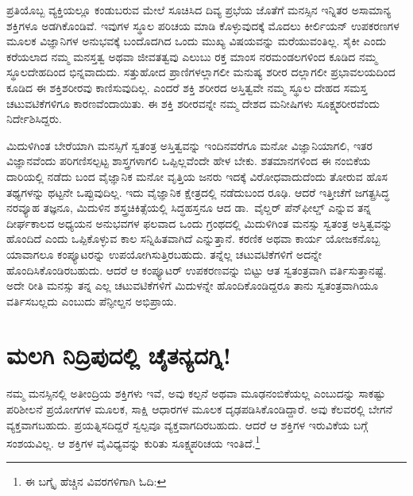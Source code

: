 ಪ್ರತಿಯೊಬ್ಬ ವ್ಯಕ್ತಿಯಲ್ಲೂ ಕಂಡುಬರುವ ಮೇಲೆ ಸೂಚಿಸಿದ ದಿವ್ಯ ಪ್ರಭೆಯ ಜೊತೆಗೆ ಮನಸ್ಸಿನ ಇನ್ನಿತರ ಅಸಾಮಾನ್ಯ ಶಕ್ತಿಗಳೂ ಅಡಗಿಕೊಂಡಿವೆ. ಇವುಗಳ ಸ್ಥೂಲ ಪರಿಚಯ ಮಾಡಿ ಕೊಳ್ಳುವುದಕ್ಕೆ ಮೊದಲು ಕೀರ್ಲಿಯನ್ ಉಪಕರಣಗಳ ಮೂಲಕ ವಿಜ್ಞಾನಿಗಳ ಅನುಭವಕ್ಕೆ ಬಂದೊದಗಿದ ಒಂದು ಮುಖ್ಯ ವಿಷಯವನ್ನು ಮರೆಯುವಂತಿಲ್ಲ. ಸೈಕೀ ಎಂದು ಕರೆಯಲಾದ ನಮ್ಮ ಮನಸ್ತತ್ವ ಅಥವಾ ಜೀವತತ್ವವು ಎಲುಬು ರಕ್ತ ಮಾಂಸ ನರಮಂಡಲಗಳಿಂದ ಕೂಡಿದ ನಮ್ಮ ಸ್ಥೂಲದೇಹದಿಂದ ಭಿನ್ನವಾದುದು. ಸತ್ತುಹೋದ ಪ್ರಾಣಿಗಳಲ್ಲಾಗಲೀ ಮನುಷ್ಯ ಶರೀರ ದಲ್ಲಾಗಲೀ ಪ್ರಭಾವಲಯದಿಂದ ಕೂಡಿದ ಈ ಶಕ್ತಿಶರೀರವು ಕಾಣಿಸುವುದಿಲ್ಲ. ಎಂದರೆ ಶಕ್ತಿ ಶರೀರದ ಅಸ್ತಿತ್ವವೇ ನಮ್ಮ ಸ್ಥೂಲ ದೇಹದ ಸಮಸ್ತ ಚಟುವಟಿಕೆಗಳಿಗೂ ಕಾರಣವೆಂದಾಯಿತು. ಈ ಶಕ್ತಿ ಶರೀರವನ್ನೇ ನಮ್ಮ ದೇಶದ ಮನೀಷಿಗಳು ಸೂಕ್ಷ್ಮಶರೀರವೆಂದು ನಿರ್ದೇಶಿಸಿದ್ದರು.

\vskip 3pt

ಮಿದುಳಿಗಿಂತ ಬೇರೆಯಾಗಿ ಮನಸ್ಸಿಗೆ ಸ್ವತಂತ್ರ ಅಸ್ತಿತ್ವವನ್ನು ಇಂದಿನವರೆಗೂ ಮನೋ ವಿಜ್ಞಾನಿಯಾಗಲಿ, ಇತರ ವಿಜ್ಞಾನವೆಂದು ಪರಿಗಣಿಸಲ್ಪಟ್ಟ ಶಾಸ್ತ್ರಗಳಾಗಲಿ ಒಪ್ಪಿಲ್ಲವೆಂದೇ ಹೇಳ ಬೇಕು. ಶತಮಾನಗಳಿಂದ ಈ ನಂಬಿಕೆಯ ದಾರಿಯಲ್ಲಿ ನಡೆದು ಬಂದ ವೈಜ್ಞಾನಿಕ ಮನೋ ವೃತ್ತಿಯ ಜನರು ಇದಕ್ಕೆ ವಿರೋಧವಾದುದೆಂದು ತೋರುವ ಹೊಸ ತಥ್ಯಗಳನ್ನು ಥಟ್ಟನೇ ಒಪ್ಪುವುದಿಲ್ಲ. ಇದು ವೈಜ್ಞಾನಿಕ ಕ್ಷೇತ್ರದಲ್ಲಿ ನಡೆದುಬಂದ ರೂಢಿ. ಆದರೆ ಇತ್ತೀಚೆಗೆ ಜಗತ್ಪ್ರಸಿದ್ಧ ನರವ್ಯೂಹ ತಜ್ಞನೂ, ಮಿದುಳಿನ ಶಸ್ತ್ರಚಿಕಿತ್ಸೆಯಲ್ಲಿ ಸಿದ್ಧಹಸ್ತನೂ ಆದ ಡಾ.\ ವೈಲ್ಡರ್ ಪೆನ್​ಫೀಲ್ಡ್  ಎನ್ನುವ ತನ್ನ ದೀರ್ಘಕಾಲದ ಅಧ್ಯಯನ ಅನುಭವಗಳ ಫಲವಾದ ಒಂದು ಗ್ರಂಥದಲ್ಲಿ ಮಿದುಳಿಗಿಂತ ಮನಸ್ಸು ಸ್ವತಂತ್ರ ಅಸ್ತಿತ್ವವನ್ನು ಹೊಂದಿದೆ ಎಂದು ಒಪ್ಪಿಕೊಳ್ಳುವ ಕಾಲ ಸನ್ನಿಹಿತವಾಗಿದೆ ಎನ್ನುತ್ತಾನೆ. ಕರಣಿಕ ಅಥವಾ ಕಾರ್ಯ ಯೋಜಕನೊಬ್ಬ ಯಾವಾಗಲೂ ಕಂಪ್ಯೂಟರನ್ನು ಉಪಯೋಗಿಸುತ್ತಿರಬಹುದು. ತನ್ನೆಲ್ಲ ಚಟುವಟಿಕೆಗಳಿಗೆ ಅದನ್ನೇ ಹೊಂದಿಸಿಕೊಂಡಿರಬಹುದು. ಆದರೆ ಆ ಕಂಪ್ಯೂಟರ್ ಉಪಕರಣವನ್ನು ಬಿಟ್ಟು ಆತ ಸ್ವತಂತ್ರವಾಗಿ ವರ್ತಿಸುತ್ತಾನಷ್ಟೆ. ಅದೇ ರೀತಿ ಮನಸ್ಸು ತನ್ನ ಎಲ್ಲ ಚಟುವಟಿಕೆಗಳಿಗೆ ಮಿದುಳನ್ನೇ ಹೊಂದಿಕೊಂಡಿದ್ದರೂ ತಾನು ಸ್ವತಂತ್ರವಾಗಿಯೂ ವರ್ತಿಸಬಲ್ಲದು ಎಂಬುದು ಪೆನ್ಫೀಲ್ಡನ ಅಭಿಪ್ರಾಯ.


\section*{ಮಲಗಿ ನಿದ್ರಿಪುದಲ್ಲಿ ಚೈತನ್ಯದಗ್ನಿ!}


ನಮ್ಮ ಮನಸ್ಸಿನಲ್ಲಿ ಅತೀಂದ್ರಿಯ ಶಕ್ತಿಗಳು ಇವೆ, ಅವು ಕಲ್ಪನೆ ಅಥವಾ ಮೂಢನಂಬಿಕೆಯಲ್ಲ ಎಂಬುದನ್ನು ಸಾಕಷ್ಟು ಪರಿಶೀಲನೆ ಪ್ರಯೋಗಗಳ ಮೂಲಕ, ಸಾಕ್ಷಿ ಆಧಾರಗಳ ಮೂಲಕ ದೃಢ\-ಪಡಿಸಿಕೊಂಡಿದ್ದಾರೆ. ಅವು ಕೆಲವರಲ್ಲಿ ಬೇಗನೆ ವ್ಯಕ್ತವಾಗಬಹುದು. ಪ್ರಯತ್ನಿಸದಿದ್ದರೆ ಸ್ವಲ್ಪವೂ ವ್ಯಕ್ತವಾಗದಿರಬಹುದು. ಆದರೆ ಆ ಶಕ್ತಿಗಳ ಇರುವಿಕೆಯ ಬಗ್ಗೆ ಸಂಶಯವಿಲ್ಲ. ಆ ಶಕ್ತಿಗಳ ವೈವಿಧ್ಯವನ್ನು ಕುರಿತು ಸೂಕ್ಷ್ಮಪರಿಚಯ ಇಂತಿದೆ.\footnote{ಈ ಬಗ್ಕೆೃ ಹೆಚ್ಚಿನ ವಿವರಗಳಿಗಾಗಿ ಓದಿ: }

